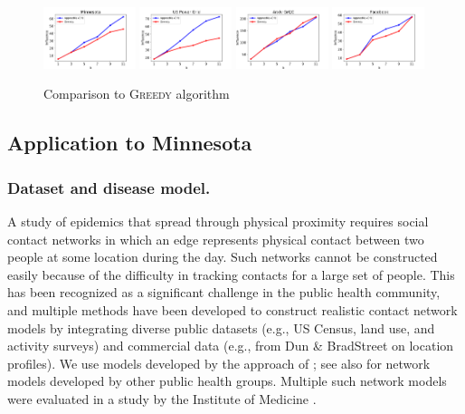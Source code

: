 \begin{figure}
\centering
\includegraphics[width=0.24\textwidth]{img/baseline-mn-blkgrp.pdf}
\includegraphics[width=0.24\textwidth]{img/baseline-USpowergrid.pdf}
\includegraphics[width=0.24\textwidth]{img/baseline-ca-GrQC.pdf}
\includegraphics[width=0.24\textwidth]{img/baseline-facebook.pdf}\\
\caption{Comparison to \textsc{Greedy} algorithm}
\label{fig:compare-greedy}
\end{figure}

\subsection{Application to Minnesota}
\subsubsection{Dataset and disease model.}
\label{sec:data}
A study of epidemics that spread through physical proximity requires social contact networks in which an edge represents physical contact
between two people at some location during the day. Such networks cannot be constructed easily because of the difficulty in tracking contacts for a large set of people.
This has been recognized as a significant challenge in the public health community,
and multiple methods have been developed to construct realistic contact
network models by integrating diverse public datasets
(e.g., US Census, land use, and activity surveys) and
commercial data (e.g., from Dun \& BradStreet on location profiles).
We use models developed by the approach of 
\cite{eubank:nature04}; %
see also \cite{longini05:science,fc+06} for network
models developed by other public health groups. %
Multiple such network models were evaluated in a study by the Institute of Medicine
\cite{halloran:pnas08}.

